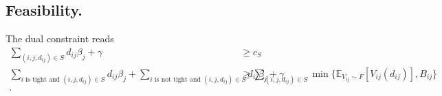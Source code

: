 \subsection{Feasibility.}

The dual constraint reads
\begin{align*}
    \sum_{(i,j,d_{ij}) \in S} d_{ij} \beta_j + \gamma &\geq c_{S} \\
    \sum_{i \text{ is tight and } (i,j,d_{ij}) \in S} d_{ij} \beta_j + \sum_{i \text{ is not tight and } (i,j,d_{ij}) \in S} d_{ij} \beta_j + \gamma &\geq  \sum_{(i,j,d_{ij}) \in S} \min\{ \mathbb{E}_{V_{ij} \sim F}[V_{ij}(d_{ij})], B_{ij}\} \\.
\end{align*}
